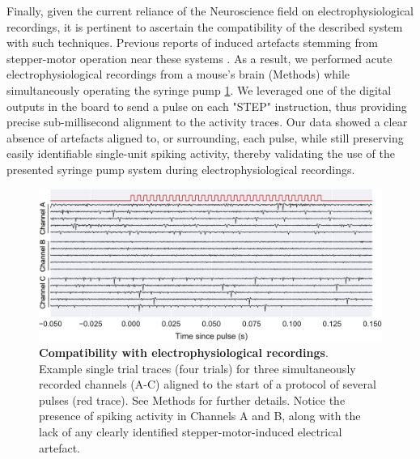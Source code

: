 Finally, given the current reliance of the Neuroscience field on electrophysiological recordings, it is pertinent to ascertain the compatibility of the described system with such techniques. Previous reports of induced artefacts stemming from stepper-motor operation near these systems \citep{Amarante2019}. As a result, we performed acute electrophysiological recordings from a mouse's brain (Methods) while simultaneously operating the syringe pump \ref{fig:Ephys}. 
We leveraged one of the digital outputs in the board to send a pulse on each "STEP" instruction, thus providing precise sub-millisecond alignment to the activity traces. 
Our data showed a clear absence of artefacts aligned to, or surrounding, each pulse, while still preserving easily identifiable single-unit spiking activity, thereby validating the use of the presented syringe pump system during electrophysiological recordings.

\begin{figure}[ht] 
	\centering
	\includegraphics[width=1.0\linewidth]{Figures/Artboard 7.pdf}
	\caption{\textbf{Compatibility with electrophysiological recordings}.\\
	Example single trial traces (four trials) for three simultaneously recorded channels (A-C) aligned to the start of a protocol of several pulses (red trace). See Methods for further details. Notice the presence of spiking activity in Channels A and B, along with the lack of any clearly identified stepper-motor-induced electrical artefact.}	
	\label{fig:Ephys}
\end{figure}




